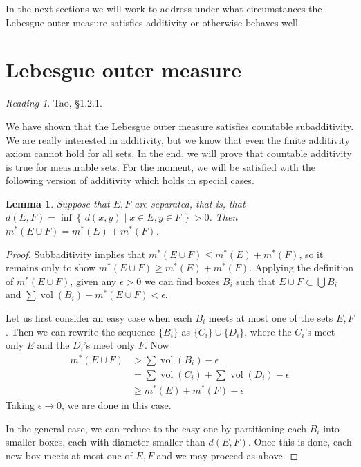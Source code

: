 \documentclass[11pt,oneside]{amsbook}
\newcommand{\set}[1]{\left\{\,#1\,\right\}}
\DeclareMathOperator{\vol}{vol}
\theoremstyle{definition}
\theoremstyle{plain}
\newtheorem{lem}[thm]{Lemma}
\theoremstyle{definition}
\theoremstyle{remark}
\newtheorem*{reading}{Reading}
\numberwithin{equation}{section}
\numberwithin{figure}{section}
\begin{document}
In the next sections we will work to address under what circumstances the Lebesgue outer measure satisfies additivity or otherwise behaves well.


\section{Lebesgue outer measure}

\begin{reading}
  Tao, \S 1.2.1.
\end{reading}

We have shown that the Lebesgue outer measure satisfies countable subadditivity. We are really interested in additivity, but we know that even the finite additivity axiom cannot hold for all sets. In the end, we will prove that countable additivity is true for measurable sets. For the moment, we will be satisfied with the following version of additivity which holds in special cases.


\begin{lem}
  Suppose that $E,F$ are separated, that is, that $d(E,F)=\inf\set{d(x,y)\mid x\in E, y\in F}>0$. Then $m^*(E\cup F)=m^*(E)+m^*(F)$.
\end{lem}

\begin{proof}
  Subbaditivity implies that $m^*(E\cup F)\leq m^*(E)+m^*(F)$, so it remains only to show $m^*(E\cup F)\geq m^*(E)+m^*(F)$. Applying the definition of $m^*(E\cup F)$, given any $\epsilon>0$ we can find boxes $B_i$ such that $E\cup F\subset\bigcup B_i$ and $\sum\vol(B_i)-m^*(E\cup F)<\epsilon$.

  Let us first consider an easy case when each $B_i$ meets at most one of the sets $E,F$. Then we can rewrite the sequence $\{B_i\}$ as $\{C_i\}\cup\{D_i\}$, where the $C_i$'s meet only $E$ and the $D_i$'s meet only $F$. Now
  \begin{align*}
    m^*(E\cup F)&>\sum\vol(B_i)-\epsilon\\
                &=\sum\vol(C_i)+\sum\vol(D_i)-\epsilon\\
                &\geq m^*(E)+m^*(F)-\epsilon
  \end{align*}
  Taking $\epsilon\to0$, we are done in this case.

  In the general case, we can reduce to the easy one by partitioning each $B_i$ into smaller boxes, each with diameter smaller than $d(E,F)$. Once this is done, each new box meets at most one of $E,F$ and we may proceed as above.
\end{proof}
\end{document}
